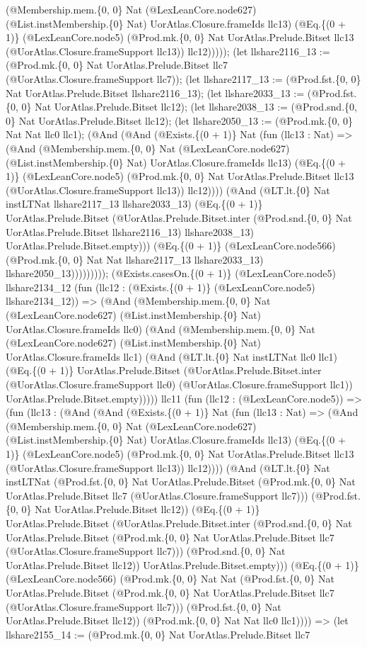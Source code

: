 \documentclass[11pt]{article}
\begin{document}
(@Membership.mem.\{0, 0\} Nat (@LexLeanCore.node627) (@List.instMembership.\{0\} Nat) UorAtlas.Closure.frameIds llc13) (@Eq.\{(0 + 1)\} (@LexLeanCore.node5) (@Prod.mk.\{0, 0\} Nat UorAtlas.Prelude.Bitset llc13 (@UorAtlas.Closure.frameSupport llc13)) llc12))))); (let llshare2116\_13 := (@Prod.mk.\{0, 0\} Nat UorAtlas.Prelude.Bitset llc7 (@UorAtlas.Closure.frameSupport llc7)); (let llshare2117\_13 := (@Prod.fst.\{0, 0\} Nat UorAtlas.Prelude.Bitset llshare2116\_13); (let llshare2033\_13 := (@Prod.fst.\{0, 0\} Nat UorAtlas.Prelude.Bitset llc12); (let llshare2038\_13 := (@Prod.snd.\{0, 0\} Nat UorAtlas.Prelude.Bitset llc12); (let llshare2050\_13 := (@Prod.mk.\{0, 0\} Nat Nat llc0 llc1); (@And (@And (@Exists.\{(0 + 1)\} Nat (fun (llc13 : Nat) => (@And (@Membership.mem.\{0, 0\} Nat (@LexLeanCore.node627) (@List.instMembership.\{0\} Nat) UorAtlas.Closure.frameIds llc13) (@Eq.\{(0 + 1)\} (@LexLeanCore.node5) (@Prod.mk.\{0, 0\} Nat UorAtlas.Prelude.Bitset llc13 (@UorAtlas.Closure.frameSupport llc13)) llc12)))) (@And (@LT.lt.\{0\} Nat instLTNat llshare2117\_13 llshare2033\_13) (@Eq.\{(0 + 1)\} UorAtlas.Prelude.Bitset (@UorAtlas.Prelude.Bitset.inter (@Prod.snd.\{0, 0\} Nat UorAtlas.Prelude.Bitset llshare2116\_13) llshare2038\_13) UorAtlas.Prelude.Bitset.empty))) (@Eq.\{(0 + 1)\} (@LexLeanCore.node566) (@Prod.mk.\{0, 0\} Nat Nat llshare2117\_13 llshare2033\_13) llshare2050\_13))))))))); (@Exists.casesOn.\{(0 + 1)\} (@LexLeanCore.node5) llshare2134\_12 (fun (llc12 : (@Exists.\{(0 + 1)\} (@LexLeanCore.node5) llshare2134\_12)) => (@And (@Membership.mem.\{0, 0\} Nat (@LexLeanCore.node627) (@List.instMembership.\{0\} Nat) UorAtlas.Closure.frameIds llc0) (@And (@Membership.mem.\{0, 0\} Nat (@LexLeanCore.node627) (@List.instMembership.\{0\} Nat) UorAtlas.Closure.frameIds llc1) (@And (@LT.lt.\{0\} Nat instLTNat llc0 llc1) (@Eq.\{(0 + 1)\} UorAtlas.Prelude.Bitset (@UorAtlas.Prelude.Bitset.inter (@UorAtlas.Closure.frameSupport llc0) (@UorAtlas.Closure.frameSupport llc1)) UorAtlas.Prelude.Bitset.empty))))) llc11 (fun (llc12 : (@LexLeanCore.node5)) => (fun (llc13 : (@And (@And (@Exists.\{(0 + 1)\} Nat (fun (llc13 : Nat) => (@And (@Membership.mem.\{0, 0\} Nat (@LexLeanCore.node627) (@List.instMembership.\{0\} Nat) UorAtlas.Closure.frameIds llc13) (@Eq.\{(0 + 1)\} (@LexLeanCore.node5) (@Prod.mk.\{0, 0\} Nat UorAtlas.Prelude.Bitset llc13 (@UorAtlas.Closure.frameSupport llc13)) llc12)))) (@And (@LT.lt.\{0\} Nat instLTNat (@Prod.fst.\{0, 0\} Nat UorAtlas.Prelude.Bitset (@Prod.mk.\{0, 0\} Nat UorAtlas.Prelude.Bitset llc7 (@UorAtlas.Closure.frameSupport llc7))) (@Prod.fst.\{0, 0\} Nat UorAtlas.Prelude.Bitset llc12)) (@Eq.\{(0 + 1)\} UorAtlas.Prelude.Bitset (@UorAtlas.Prelude.Bitset.inter (@Prod.snd.\{0, 0\} Nat UorAtlas.Prelude.Bitset (@Prod.mk.\{0, 0\} Nat UorAtlas.Prelude.Bitset llc7 (@UorAtlas.Closure.frameSupport llc7))) (@Prod.snd.\{0, 0\} Nat UorAtlas.Prelude.Bitset llc12)) UorAtlas.Prelude.Bitset.empty))) (@Eq.\{(0 + 1)\} (@LexLeanCore.node566) (@Prod.mk.\{0, 0\} Nat Nat (@Prod.fst.\{0, 0\} Nat UorAtlas.Prelude.Bitset (@Prod.mk.\{0, 0\} Nat UorAtlas.Prelude.Bitset llc7 (@UorAtlas.Closure.frameSupport llc7))) (@Prod.fst.\{0, 0\} Nat UorAtlas.Prelude.Bitset llc12)) (@Prod.mk.\{0, 0\} Nat Nat llc0 llc1)))) => (let llshare2155\_14 := (@Prod.mk.\{0, 0\} Nat UorAtlas.Prelude.Bitset llc7 
\end{document}
